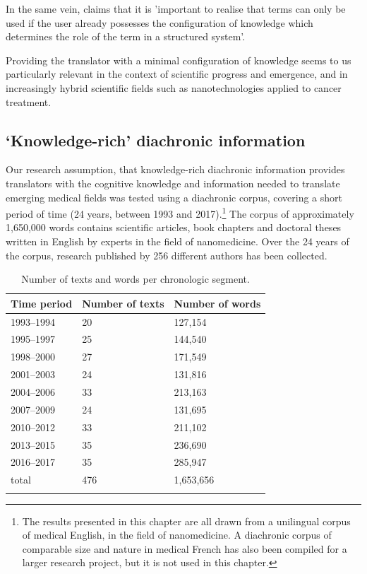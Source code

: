 \documentclass[output=paper]{langscibook}
\begin{document}
In the same vein, \citet{Sager1990} claims that it is 'important to realise that terms can only be used if the user already possesses the configuration of knowledge which determines the role of the term in a structured system'. \citep[75]{Sager1990}

Providing the translator with a minimal configuration of knowledge seems to us particularly relevant in the context of scientific progress and emergence, and in increasingly hybrid scientific fields such as nanotechnologies applied to cancer treatment.

\subsection{‘Knowledge-rich’ diachronic information}\label{sec:cuchet:2.2}

Our research assumption, that knowledge-rich diachronic information provides translators with the cognitive knowledge and information needed to translate emerging medical fields was tested using a diachronic corpus, covering a short period of time (24 years, between 1993 and 2017).\footnote{The results presented in this chapter are all drawn from a unilingual corpus of medical English, in the field of nanomedicine. A diachronic corpus of comparable size and nature in medical French has also been compiled for a larger research project, but it is not used in this chapter.} The corpus of approximately 1,650,000 words contains scientific articles, book chapters and doctoral theses written in English by experts in the field of nanomedicine. Over the 24 years of the corpus, research published by 256 different authors has been collected.

\begin{table}
\begin{tabularx}{\textwidth}{lYY}
\lsptoprule
{{{Time period}}} & {{{Number of texts}}} & {{{Number of words}}}\\
\midrule
{ 1993–1994}    & { 20}                   &    { 127,154}    \\
{ 1995–1997}    & { 25}                   &    { 144,540}    \\
{ 1998–2000}    & { 27}                   &    { 171,549}    \\
{ 2001–2003}    & { 24}                   &    { 131,816}    \\
{ 2004–2006}    & { 33}                   &    { 213,163}    \\
{ 2007–2009}    & { 24}                   &    { 131,695}    \\
{ 2010–2012}    & { 33}                   &    { 211,102}    \\
{ 2013–2015}    & { 35}                   &    { 236,690}    \\
{ 2016–2017}    & { 35}                   &    { 285,947}    \\
\midrule
  {total} &     {476}         &      {1,653,656}\\
\lspbottomrule
\end{tabularx}

\caption{Number of texts and words per chronologic segment.}
\label{tab:key:1}
\end{table}
\end{document}

